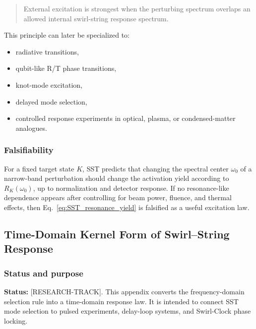         \begin{quote}
            External excitation is strongest when the perturbing spectrum overlaps an allowed internal swirl-string response spectrum.
        \end{quote}
        
        This principle can later be specialized to:
        \begin{itemize}
            \item radiative transitions,
            \item qubit-like R/T phase transitions,
            \item knot-mode excitation,
            \item delayed mode selection,
            \item controlled response experiments in optical, plasma, or condensed-matter analogues.
        \end{itemize}
    
    \subsubsection*{Falsifiability}
        
        For a fixed target state \(K\), SST predicts that changing the spectral center \(\omega_0\) of a narrow-band perturbation should change the activation yield according to \(R_K(\omega_0)\), up to normalization and detector response. If no resonance-like dependence appears after controlling for beam power, fluence, and thermal effects, then Eq.~\eqref{eq:SST_resonance_yield} is falsified as a useful excitation law.

\subsection{Time-Domain Kernel Form of Swirl--String Response}
    \label{app:time-domain-kernel-response}
    
    \subsubsection*{Status and purpose}
        
        \noindent
        \textbf{Status:} [RESEARCH-TRACK].
        This appendix converts the frequency-domain selection rule into a time-domain response law. It is intended to connect SST mode selection to pulsed experiments, delay-loop systems, and Swirl-Clock phase locking.
    
